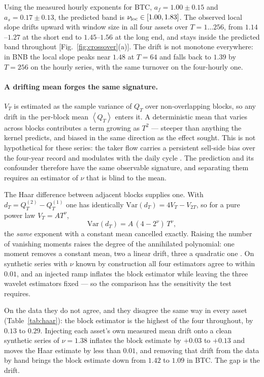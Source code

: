 \documentclass[aps,pre,twocolumn,superscriptaddress,floatfix,nofootinbib]{revtex4-2}
\newcommand{\avg}[1]{\left\langle #1 \right\rangle}
\newcommand{\Var}{\mathrm{Var}}
\begin{document}
Using the measured hourly exponents for BTC, $a_f=1.00\pm0.15$ and
$a_s=0.17\pm0.13$, the predicted band is $\nu_{\rm loc}\in[1.00,1.83]$. The
observed local slope drifts upward with window size in all four assets over
$T=1\ldots256$, from $1.14$--$1.27$ at the short end to $1.45$--$1.56$ at the
long end, and stays inside the predicted band throughout
[Fig.~\ref{fig:crossover}(a)]. The drift is not monotone everywhere: in BNB the
local slope peaks near $1.48$ at $T=64$ and falls back to $1.39$ by $T=256$ on
the hourly series, with the same turnover on the four-hourly one.

\paragraph*{A drifting mean forges the same signature.}
$V_T$ is estimated as the sample variance of $Q_T$ over non-overlapping blocks,
so any drift in the per-block mean $\avg{Q_T}$ enters it. A deterministic mean
that varies across blocks contributes a term growing as $T^2$ --- steeper than
anything the kernel predicts, and biased in the same direction as the effect
sought. This is not hypothetical for these series: the taker flow carries a
persistent sell-side bias over the four-year record and modulates with the
daily cycle \cite{paper1}. The prediction and its confounder therefore have the
same observable signature, and separating them requires an estimator of $\nu$
that is blind to the mean.

The Haar difference between adjacent blocks supplies one. With
$d_T = Q_T^{(2)}-Q_T^{(1)}$ one has identically
$\Var(d_T)=4V_T-V_{2T}$, so for a pure power law $V_T=AT^{\nu}$,
\begin{equation}
  \Var(d_T)=A\,(4-2^{\nu})\,T^{\nu},
  \label{eq:haar}
\end{equation}
the \emph{same} exponent with a constant mean cancelled exactly. Raising the
number of vanishing moments raises the degree of the annihilated polynomial:
one moment removes a constant mean, two a linear drift, three a quadratic one
\cite{daubechies1992,percival2000}. On synthetic series with $\nu$ known by
construction all four estimators agree to within $0.01$, and an injected ramp
inflates the block estimator while leaving the three wavelet estimators fixed
--- so the comparison has the sensitivity the test requires.

On the data they do not agree, and they disagree the same way in every asset
(Table~\ref{tab:haar}): the block estimator is the highest of the four
throughout, by $0.13$ to $0.29$. Injecting each asset's own measured mean drift
onto a clean synthetic series of $\nu=1.38$ inflates the block estimate by
$+0.03$ to $+0.13$ and moves the Haar estimate by less than $0.01$, and
removing that drift from the data by hand brings the block estimate down from
$1.42$ to $1.09$ in BTC. The gap is the drift.
\end{document}
